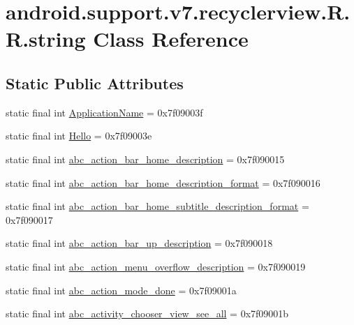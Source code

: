 \hypertarget{classandroid_1_1support_1_1v7_1_1recyclerview_1_1_r_1_1string}{
\section{android.support.v7.recyclerview.R.R.string Class Reference}
\label{classandroid_1_1support_1_1v7_1_1recyclerview_1_1_r_1_1string}
}
\subsection*{Static Public Attributes}
\begin{CompactItemize}
\item 
static final int \hyperlink{classandroid_1_1support_1_1v7_1_1recyclerview_1_1_r_1_1string_326178de5166cf1cc229de7f182a0230}{ApplicationName} = 0x7f09003f
\item 
static final int \hyperlink{classandroid_1_1support_1_1v7_1_1recyclerview_1_1_r_1_1string_fa63c3be9e137cb7f03a00d66e1afb97}{Hello} = 0x7f09003e
\item 
static final int \hyperlink{classandroid_1_1support_1_1v7_1_1recyclerview_1_1_r_1_1string_f1526da9897d35ebaa77ee39f7122334}{abc\_\-action\_\-bar\_\-home\_\-description} = 0x7f090015
\item 
static final int \hyperlink{classandroid_1_1support_1_1v7_1_1recyclerview_1_1_r_1_1string_6999817628ad608a72ba6cf949cd96dc}{abc\_\-action\_\-bar\_\-home\_\-description\_\-format} = 0x7f090016
\item 
static final int \hyperlink{classandroid_1_1support_1_1v7_1_1recyclerview_1_1_r_1_1string_27b008f51a7714977caeb06860f6cd1d}{abc\_\-action\_\-bar\_\-home\_\-subtitle\_\-description\_\-format} = 0x7f090017
\item 
static final int \hyperlink{classandroid_1_1support_1_1v7_1_1recyclerview_1_1_r_1_1string_3d9e1c1ffd91ad1fbfa12f4a6a2e9aa1}{abc\_\-action\_\-bar\_\-up\_\-description} = 0x7f090018
\item 
static final int \hyperlink{classandroid_1_1support_1_1v7_1_1recyclerview_1_1_r_1_1string_2a5cf461439721fde2931b6905b30ed5}{abc\_\-action\_\-menu\_\-overflow\_\-description} = 0x7f090019
\item 
static final int \hyperlink{classandroid_1_1support_1_1v7_1_1recyclerview_1_1_r_1_1string_dcd5dee97a3fedcd92c813c16369d401}{abc\_\-action\_\-mode\_\-done} = 0x7f09001a
\item 
static final int \hyperlink{classandroid_1_1support_1_1v7_1_1recyclerview_1_1_r_1_1string_1ac98ad7e4e6a5d30105f0cfb84262a0}{abc\_\-activity\_\-chooser\_\-view\_\-see\_\-all} = 0x7f09001b

\end{CompactItemize}
